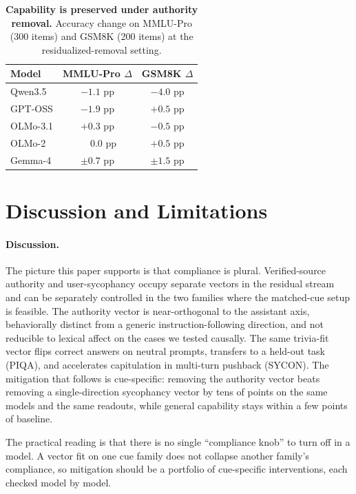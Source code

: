 \documentclass{article}
\begin{document}
\begin{table}[t]
\centering
\caption{\textbf{Capability is preserved under authority removal.} Accuracy change on MMLU-Pro (300 items) and GSM8K (200 items) at the residualized-removal setting.}
\label{tab:capability}
\small
\begin{tabular}{lcc}
\toprule
Model & MMLU-Pro $\Delta$ & GSM8K $\Delta$ \\
\midrule
Qwen3.5     & $-1.1$ pp & $-4.0$ pp \\
GPT-OSS     & $-1.9$ pp & $+0.5$ pp \\
OLMo-3.1    & $+0.3$ pp & $-0.5$ pp \\
OLMo-2      & $\phantom{-}0.0$ pp & $+0.5$ pp \\
Gemma-4     & $\pm 0.7$ pp & $\pm 1.5$ pp \\
\bottomrule
\end{tabular}
\end{table}

\section{Discussion and Limitations}
\label{sec:discussion}

\paragraph{Discussion.} The picture this paper supports is that compliance is plural. Verified-source authority and user-sycophancy occupy separate vectors in the residual stream and can be separately controlled in the two families where the matched-cue setup is feasible. The authority vector is near-orthogonal to the assistant axis, behaviorally distinct from a generic instruction-following direction, and not reducible to lexical affect on the cases we tested causally. The same trivia-fit vector flips correct answers on neutral prompts, transfers to a held-out task (PIQA), and accelerates capitulation in multi-turn pushback (SYCON). The mitigation that follows is cue-specific: removing the authority vector beats removing a single-direction sycophancy vector by tens of points on the same models and the same readouts, while general capability stays within a few points of baseline.

The practical reading is that there is no single ``compliance knob'' to turn off in a model. A vector fit on one cue family does not collapse another family's compliance, so mitigation should be a portfolio of cue-specific interventions, each checked model by model.
\end{document}
